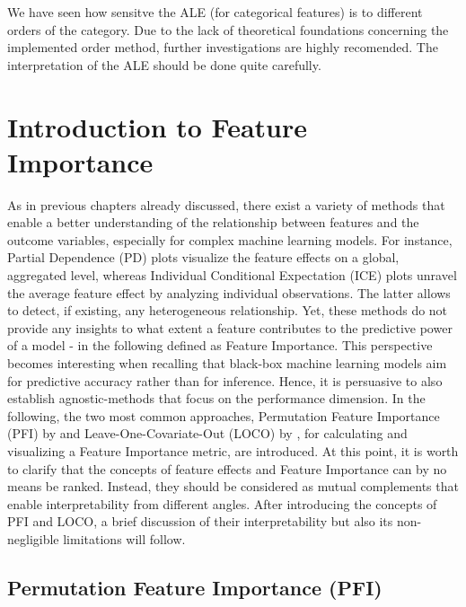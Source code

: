\documentclass[
]{krantz}
\begin{document}
We have seen how sensitve the ALE (for categorical features) is to different orders of the category. Due to the lack of theoretical foundations concerning the implemented order method, further investigations are highly recomended. The interpretation of the ALE should be done quite carefully.

\hypertarget{introduction-to-feature-importance}{%
\chapter{Introduction to Feature Importance}\label{introduction-to-feature-importance}}

As in previous chapters already discussed, there exist a variety of methods that enable a better understanding of the relationship between features and the outcome variables, especially for complex machine learning models. For instance, Partial Dependence (PD) plots visualize the feature effects on a global, aggregated level, whereas Individual Conditional Expectation (ICE) plots unravel the average feature effect by analyzing individual observations. The latter allows to detect, if existing, any heterogeneous relationship. Yet, these methods do not provide any insights to what extent a feature contributes to the predictive power of a model - in the following defined as Feature Importance. This perspective becomes interesting when recalling that black-box machine learning models aim for predictive accuracy rather than for inference. Hence, it is persuasive to also establish agnostic-methods that focus on the performance dimension. In the following, the two most common approaches, Permutation Feature Importance (PFI) by \citet{breiman2001random} and Leave-One-Covariate-Out (LOCO) by \citet{lei2018distribution}, for calculating and visualizing a Feature Importance metric, are introduced. At this point, it is worth to clarify that the concepts of feature effects and Feature Importance can by no means be ranked. Instead, they should be considered as mutual complements that enable interpretability from different angles. After introducing the concepts of PFI and LOCO, a brief discussion of their interpretability but also its non-negligible limitations will follow.

\hypertarget{permutation-feature-importance-pfi}{%
\section{Permutation Feature Importance (PFI)}\label{permutation-feature-importance-pfi}}
\end{document}
